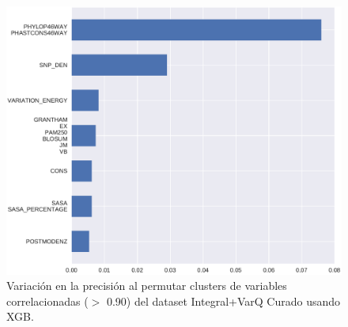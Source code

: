 \begin{figure}[H]
    \centering
    \includegraphics[scale=0.6]{documents/latex/figures/3/integral_varq/integral_varq_importance_cluster_xgb.pdf}
    \caption{Variación en la precisión al permutar clusters de variables correlacionadas ($>$ 0.90) del dataset Integral+VarQ Curado usando XGB.}
    \label{fig:importance_cluster_integral_varq_xgb}
\end{figure}


